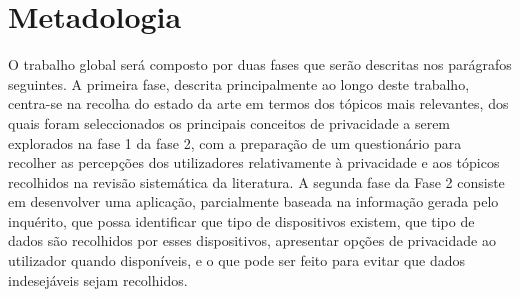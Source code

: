 \documentclass[conference]{IEEEtran}
\begin{document}

\section{Metadologia}

O trabalho global será composto por duas fases que serão descritas nos
parágrafos seguintes. A primeira fase, descrita principalmente ao longo
deste trabalho, centra-se na recolha do estado da arte em termos dos tópicos
mais relevantes, dos quais foram seleccionados os principais conceitos de
privacidade a serem explorados na fase 1 da fase 2, com a preparação de
um questionário para recolher as percepções dos utilizadores relativamente
à privacidade e aos tópicos recolhidos na revisão sistemática da literatura.
A segunda fase da Fase 2 consiste em desenvolver uma aplicação, parcialmente
baseada na informação gerada pelo inquérito, que possa identificar que tipo
de dispositivos existem, que tipo de dados são recolhidos por esses
dispositivos, apresentar opções de privacidade ao utilizador quando
disponíveis, e o que pode ser feito para evitar que dados indesejáveis
sejam recolhidos.
\end{document}
